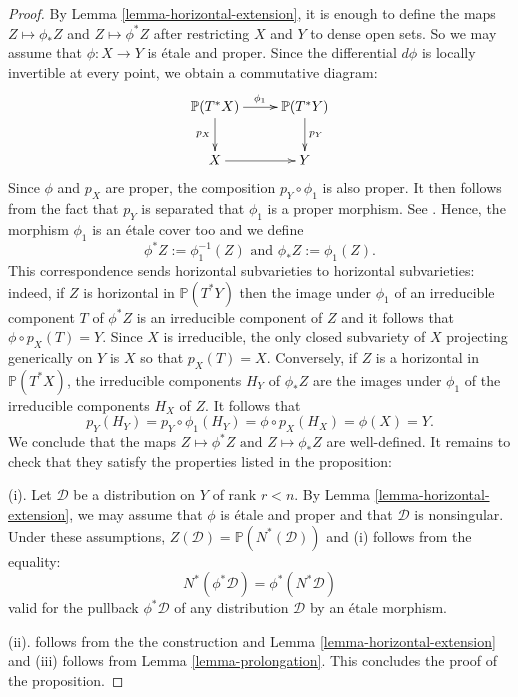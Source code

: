 \documentclass[12pt]{amsart}
\renewcommand{\P}{\mathbb{P}}
\theoremstyle{definition}
\theoremstyle{plain}
\theoremstyle{exampstyle}
\theoremstyle{exampstyle}\newtheorem{thmxbis}{Theorem}
\numberwithin{equation}{section}
\theoremstyle{remark}
\begin{document}
\begin{proof} 
By Lemma \ref{lemma-horizontal-extension}, it is enough to define the maps $Z \mapsto \phi_\ast Z$ and $Z \mapsto \phi^\ast Z$ after restricting $X$ and $Y$ to dense open sets. So we may assume that $\phi: X \rightarrow Y$
is étale and proper. Since the differential $d\phi$ is locally invertible at every point, we obtain a commutative diagram: 
$$ \xymatrix{ \P(T^\ast X) \ar[d]_{p_X} \ar[r]^{\phi_1} & \P(T^\ast Y) \ar[d]^{p_Y} \\ X \ar[r] & Y}$$
Since $\phi$ and $p_X$ are proper, the composition $p_Y \circ \phi_1$ is also proper. It then follows from the fact that $p_Y$ is separated that $\phi_1$ is a proper morphism. See \cite[II, Corollary 4.8]{Hartshorne}. Hence, the morphism $\phi_1$ is an étale cover too and we define 
$$\phi^\ast Z := \phi_1^{-1}(Z) \text{ and } \phi_\ast Z := \phi_1(Z).$$ 
This correspondence sends horizontal  subvarieties to horizontal  subvarieties: indeed, if $Z$ is horizontal in $\P(T^\ast Y)$ then the image under $\phi_1$ of an irreducible component $T$ of $\phi^\ast Z$ is an irreducible component of $Z$ and it follows that 
$\phi \circ p_X(T) = Y$. Since $X$ is irreducible, the only closed subvariety of $X$ projecting generically on $Y$ is $X$ so that $p_X(T) = X$. Conversely, if $Z$ is a  horizontal in $\P(T^\ast X)$, the irreducible components $H_Y$ of $\phi_\ast Z$ are the images under $\phi_1$ of the irreducible components $H_X$ of $Z$. It follows that 
$$p_Y(H_Y) = p_Y \circ \phi_1(H_Y) = \phi \circ p_X(H_X) = \phi(X) = Y.$$
We conclude that the maps
$Z \mapsto \phi^\ast Z  \text{ and } Z \mapsto \phi_\ast Z$
are well-defined. It remains to check that they satisfy the properties listed in the proposition: 

(i). Let $\mathcal D$ be a distribution on $Y$ of rank $r < n$. By Lemma \ref{lemma-horizontal-extension}, we may assume that $\phi$ is étale and proper and that $\mathcal D$ is nonsingular. Under these assumptions, $Z(\mathcal D) = \P(N^\ast (\mathcal D))$  and (i) follows from the equality: 
$$N^\ast (\phi^\ast \mathcal D) = \phi^\ast (N^\ast \mathcal D)$$
valid for the pullback $\phi^\ast \mathcal D$ of any distribution $\mathcal D$ by an étale morphism. 

(ii). follows from the the construction and Lemma \ref{lemma-horizontal-extension} and (iii) follows from Lemma \ref{lemma-prolongation}. This concludes the proof of the proposition.
\end{proof} 
\end{document}
